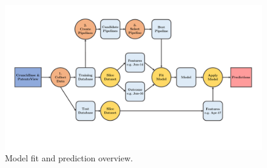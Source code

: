 \documentclass[../thesis/thesis.tex]{subfiles}
\begin{document}
\begin{figure}[!htb]
    \centering
    \includegraphics[width=\textwidth]{../figures/design/flowchart_make_predictions}
    \caption[Model fit and prediction flowchart]{Model fit and prediction overview.}
    \label{fig:design:make_predictions}
\end{figure}

\end{document}
